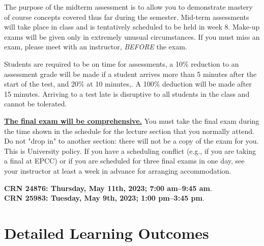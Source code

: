 \documentclass[12pt]{scrartcl}
\begin{document}
The purpose of the midterm assessment is to allow you to demonstrate mastery of course concepts covered thus far during the semester. 
Mid-term assessments will take place 
in class 
and is tentatively scheduled to be held in week 8. 
Make-up exams will be given only in extremely unusual circumstances. 
If you must miss an exam, please meet with an instructor, \textit{BEFORE} the exam. 

{\color{red}Students are required to be on time for assessments, a 10\% reduction to an assessment grade will be made if a student arrives more than 5 minutes after the start of the test, and 20\% at 10 minutes,.
A 100\% deduction will be made after 15 minutes.}
Arriving to a test late is disruptive to all students in the class and cannot be tolerated. 
 

\textbf{\underline{The final exam will be comprehensive.}}
You must take the final exam during the time shown in the schedule for the lecture section that you normally attend. 
Do not "drop in" to another section: there will not be a copy of the exam for you. 
This is University policy. If you have a scheduling conflict (e.g., if you are taking a final at EPCC) or if you are scheduled for three final exams in one day, see your instructor at least a week in advance for arranging accommodation.
\begin{tcolorbox}[colback=green!5,colframe=green!75!black,title=Final Exam Date]
\begin{center}
\textbf{CRN 24876: Thursday, May 11th, 2023; 7:00 am--9:45 am}.\\
\textbf{CRN 25983: Tuesday, May 9th, 2023; 1:00 pm--3:45 pm}.
 \end{center}
 \end{tcolorbox}



\section{Detailed Learning Outcomes}
\end{document}
